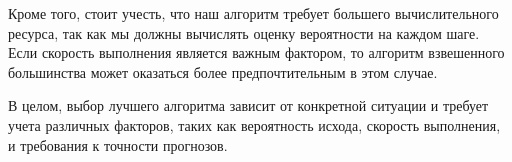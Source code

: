 \documentclass[a4paper,14pt]{extarticle}
\begin{document}
Кроме того, стоит учесть, что наш алгоритм требует большего вычислительного ресурса, так как мы должны вычислять оценку вероятности на каждом шаге. Если скорость выполнения является важным фактором, то алгоритм взвешенного большинства может оказаться более предпочтительным в этом случае.

В целом, выбор лучшего алгоритма зависит от конкретной ситуации и требует учета различных факторов, таких как вероятность исхода, скорость выполнения, и требования к точности прогнозов.
\end{document}
